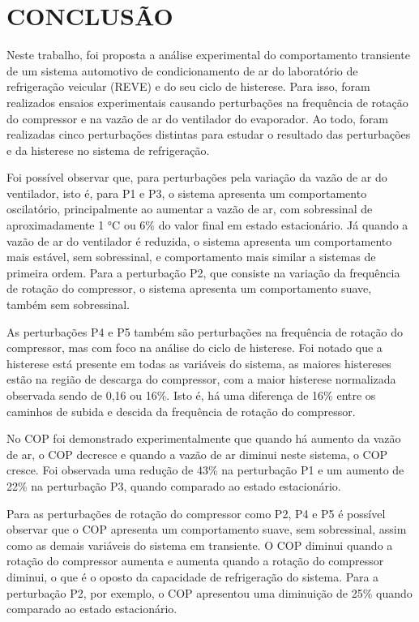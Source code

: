 \section{CONCLUSÃO}

Neste trabalho, foi proposta a análise experimental do comportamento transiente de um sistema automotivo de condicionamento de ar do laboratório de refrigeração veicular (REVE) e do seu ciclo de histerese. Para isso, foram realizados ensaios experimentais causando perturbações na frequência de rotação do compressor e na vazão de ar do ventilador do evaporador. Ao todo, foram realizadas cinco perturbações distintas para estudar o resultado das perturbações e da histerese no sistema de refrigeração. 

Foi possível observar que, para perturbações pela variação da vazão de ar do ventilador, isto é, para P1 e P3, o sistema apresenta um comportamento oscilatório, principalmente ao aumentar a vazão de ar, com sobressinal de aproximadamente 1 °C ou 6\% do valor final em estado estacionário. Já quando a vazão de ar do ventilador é reduzida, o sistema apresenta um comportamento mais estável, sem sobressinal, e comportamento mais similar a sistemas de primeira ordem. Para a perturbação P2, que consiste na variação da frequência de rotação do compressor, o sistema apresenta um comportamento suave, também sem sobressinal. 

As perturbações P4 e P5 também são perturbações na frequência de rotação do compressor, mas com foco na análise do ciclo de histerese. Foi notado que a histerese está presente em todas as variáveis do sistema, as maiores histereses estão na região de descarga do compressor, com a maior histerese normalizada observada sendo de 0,16 ou 16\%. Isto é, há uma diferença de 16\% entre os caminhos de subida e descida da frequência de rotação do compressor. 

No COP foi demonstrado experimentalmente que quando há aumento da vazão de ar, o COP decresce e quando a vazão de ar diminui neste sistema, o COP cresce. Foi observada uma redução de 43\% na perturbação P1 e um aumento de 22\% na perturbação P3, quando comparado ao estado estacionário. 

Para as perturbações de rotação do compressor como P2, P4 e P5 é possível observar que o COP apresenta um comportamento suave, sem sobressinal, assim como as demais variáveis do sistema em transiente. O COP diminui quando a rotação do compressor aumenta e aumenta quando a rotação do compressor diminui, o que é o oposto da capacidade de refrigeração do sistema. Para a perturbação P2, por exemplo, o COP apresentou uma diminuição de 25\% quando comparado ao estado estacionário. 

